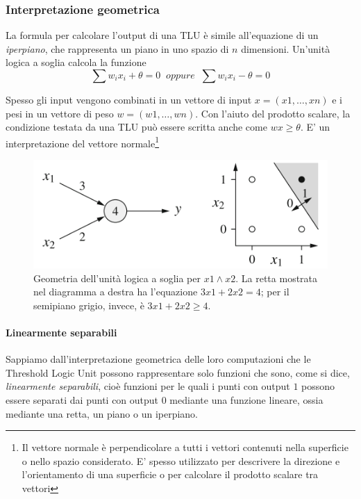 \subsubsection{Interpretazione geometrica}
La formula per calcolare l'output di una TLU è simile all'equazione di un \textit{iperpiano}, che rappresenta un piano in uno spazio di $n$ dimensioni. Un'unità logica a soglia calcola la funzione
$$\sum w_ix_i + \theta = 0 \mathit{\;\;oppure\;\;} \sum w_ix_i - \theta = 0$$

Spesso gli input vengono combinati in un vettore di input $x = (x1, \dots, xn)$ e i pesi in un vettore di peso $w = (w1, \dots, wn)$. Con l'aiuto del prodotto scalare, la condizione testata da una TLU può essere scritta anche come $wx \geq \theta$. E' un interpretazione del vettore normale\footnote{Il vettore normale è perpendicolare a tutti i vettori contenuti nella superficie o nello spazio considerato. E' spesso utilizzato per descrivere la direzione e l'orientamento di una superficie o per calcolare il prodotto scalare tra vettori}

\begin{figure}[h]
    \centering
    \includegraphics[scale=0.45]{images/geometric-tlu-and.png}
    \caption{Geometria dell'unità logica a soglia per $x1 \land x2$. La retta mostrata nel diagramma a destra ha l'equazione $3x1 + 2x2 = 4$; per il semipiano grigio, invece, è $3x1 + 2x2 \geq 4$.}
\end{figure}

\paragraph{Linearmente separabili}
Sappiamo dall'interpretazione geometrica delle loro computazioni che le Threshold Logic Unit possono rappresentare solo funzioni che sono, come si dice, \textit{linearmente separabili}, cioè funzioni per le quali i punti con output $1$ possono essere separati dai punti con output $0$ mediante una funzione lineare, ossia mediante una retta, un piano o un iperpiano.

